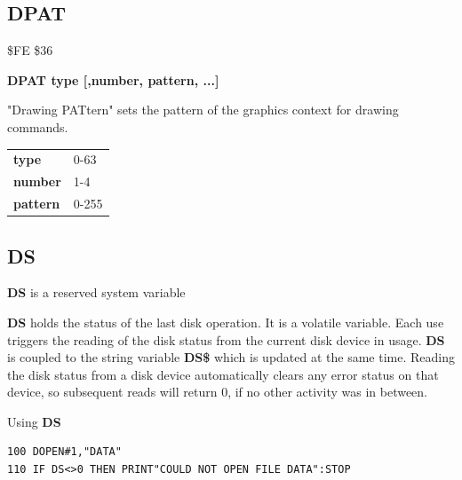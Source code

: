 
\newpage
\subsection{DPAT}
\begin{description}[leftmargin=2cm,style=nextline]
\item [Token:] \$FE \$36
\item [Format:] {\bf DPAT type [,number, pattern, ...]}
\item [Usage:]
   "Drawing PATtern" sets the pattern
   of the graphics context for drawing commands.

\begin{center}
\ttfamily
\begin{tabular}{|l|l|}
\hline
   {\bf type}       &  0-63 \\
   {\bf number}     &  1-4 \\
   {\bf pattern}    &  0-255 \\
\hline
\end{tabular}
\end{center}
\end{description}


\newpage
\subsection{DS}
\begin{description}[leftmargin=2cm,style=nextline]
\item [Format:] {\bf DS} is a reserved system variable
\item [Usage:]  {\bf DS} holds the status of the last disk operation.
                It is a volatile variable.
                Each use triggers the reading of the disk status
                from the current disk device in usage.
                {\bf DS} is coupled to the string variable {\bf DS\$}
                which is updated at the same time.
                Reading the disk status from a disk device automatically
                clears any error status on that device, so subsequent reads
                will return 0, if no other activity was in between.

\item [Example:] Using {\bf DS}
\begin{tcolorbox}[colback=black,coltext=white]
\verbatimfont{\codefont}
\begin{verbatim}
100 DOPEN#1,"DATA"
110 IF DS<>0 THEN PRINT"COULD NOT OPEN FILE DATA":STOP
\end{verbatim}
\end{tcolorbox}
\end{description}


